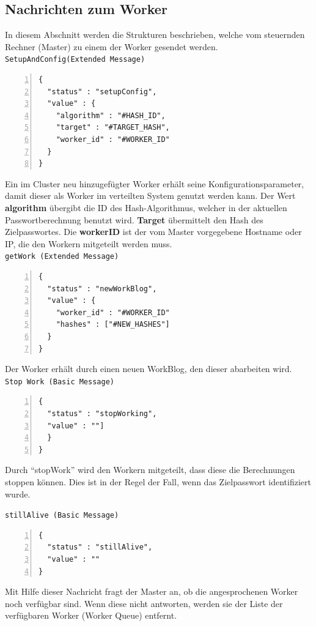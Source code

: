 \subsection{Nachrichten zum Worker}
In diesem Abschnitt werden die Strukturen beschrieben, welche vom steuernden Rechner (Master) zu einem der Worker gesendet werden.\\

\texttt{SetupAndConfig(Extended Message)}
\begin{lstlisting}[basicstyle=\ttfamily,numbers=left,numberstyle=\footnotesize\ttfamily,backgroundcolor=\color{sourcegray}]
{
  "status" : "setupConfig",
  "value" : {
    "algorithm" : "#HASH_ID",
    "target" : "#TARGET_HASH", 
    "worker_id" : "#WORKER_ID"
  }
}
\end{lstlisting}
Ein im Cluster neu hinzugefügter Worker erhält seine Konfigurationsparameter, damit dieser als Worker im verteilten System genutzt werden kann. 
Der Wert \textbf{algorithm} übergibt die ID des Hash-Algorithmus, welcher in der aktuellen Passwortberechnung benutzt wird. \textbf{Target} übermittelt den Hash des Zielpasswortes. Die \textbf{workerID} ist der vom Master vorgegebene Hostname oder IP, die den Workern mitgeteilt werden muss.\\

\texttt{getWork (Extended Message)}
\begin{lstlisting}[basicstyle=\ttfamily,numbers=left,numberstyle=\footnotesize\ttfamily,backgroundcolor=\color{sourcegray}]
{
  "status" : "newWorkBlog",
  "value" : {
    "worker_id" : "#WORKER_ID"
    "hashes" : ["#NEW_HASHES"]
  }
}
\end{lstlisting}
Der Worker erhält durch einen neuen WorkBlog, den dieser abarbeiten wird.\\

\texttt{Stop Work (Basic Message)}
\begin{lstlisting}[basicstyle=\ttfamily,numbers=left,numberstyle=\footnotesize\ttfamily,backgroundcolor=\color{sourcegray}]
{
  "status" : "stopWorking",
  "value" : ""]
  }
}
\end{lstlisting}
Durch \enquote{stopWork} wird den Workern mitgeteilt, dass diese die Berechnungen stoppen können. Dies ist in der Regel der Fall, wenn das Zielpasswort identifiziert wurde. 


\texttt{stillAlive (Basic Message)}
\begin{lstlisting}[basicstyle=\ttfamily,numbers=left,numberstyle=\footnotesize\ttfamily,backgroundcolor=\color{sourcegray}]
{
  "status" : "stillAlive",
  "value" : ""
}
\end{lstlisting}
Mit Hilfe dieser Nachricht fragt der Master an, ob die angesprochenen Worker noch verfügbar sind. Wenn diese nicht antworten, werden sie der Liste der verfügbaren Worker (Worker Queue) entfernt. 


